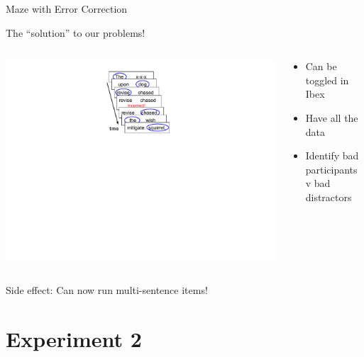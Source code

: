 \documentclass[12pt, xcolor=beamer,table,usenames,dvipsnames, ignorenonframetext, ngerman]{beamer}
\begin{document}
\begin{frame}{Maze with Error Correction}

{\large The ``solution'' to our problems!}

\begin{columns}
	\begin{column}{0.3\textwidth}
		\begin{center}
		\includegraphics[clip, trim=9cm 12.5cm 10cm 1cm,width=\textwidth]{maze_diagram.pdf}
		\end{center}
		
	\end{column} \pause 
	\begin{column}{0.7\textwidth} 
		\begin{center}
			\begin{itemize}
				\item Can be toggled in Ibex
				\item Have all the data
				\item Identify bad participants v bad distractors
			\end{itemize}
		\end{center}
	\end{column}
\end{columns}
\medskip
\pause

Side effect: Can now run multi-sentence items!
\end{frame}

\section{Experiment 2} %
\end{document}
